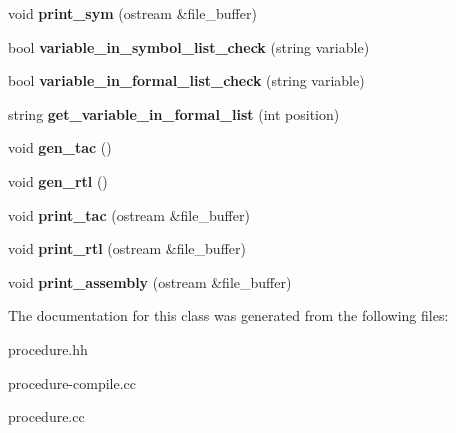 \begin{DoxyCompactItemize}
$$\item 
\mbox{\label{classProcedure_aca7277b92538b9d2ca9934d82bac4d33}} 
void {\bfseries print\+\_\+sym} (ostream \&file\+\_\+buffer)
\item 
\mbox{\label{classProcedure_a33ef0860b989a8feaef48fdc4f035c96}} 
bool {\bfseries variable\+\_\+in\+\_\+symbol\+\_\+list\+\_\+check} (string variable)
\item 
\mbox{\label{classProcedure_a6c50be43c82b60709b69a8ad74ad2927}} 
bool {\bfseries variable\+\_\+in\+\_\+formal\+\_\+list\+\_\+check} (string variable)
\item 
\mbox{\label{classProcedure_ad2a17f54a0cabe054b291705adbe3168}} 
string {\bfseries get\+\_\+variable\+\_\+in\+\_\+formal\+\_\+list} (int position)
\item 
\mbox{\label{classProcedure_af30ac020a911538474d3ad21ed05a01e}} 
void {\bfseries gen\+\_\+tac} ()
\item 
\mbox{\label{classProcedure_a31a564b7c85241fb7dcbedfae26deef9}} 
void {\bfseries gen\+\_\+rtl} ()
\item 
\mbox{\label{classProcedure_a2928b15ac5462dec2c299271659ebd1e}} 
void {\bfseries print\+\_\+tac} (ostream \&file\+\_\+buffer)
\item 
\mbox{\label{classProcedure_ac5033df3107742826a3481fac188906a}} 
void {\bfseries print\+\_\+rtl} (ostream \&file\+\_\+buffer)
\item 
\mbox{\label{classProcedure_aa0b4855bad5d9b9de1e159fb9c8a6fdc}} 
void {\bfseries print\+\_\+assembly} (ostream \&file\+\_\+buffer)
\end{DoxyCompactItemize}


The documentation for this class was generated from the following files\+:\begin{DoxyCompactItemize}
\item 
procedure.\+hh\item 
procedure-\/compile.\+cc\item 
procedure.\+cc\end{DoxyCompactItemize}
